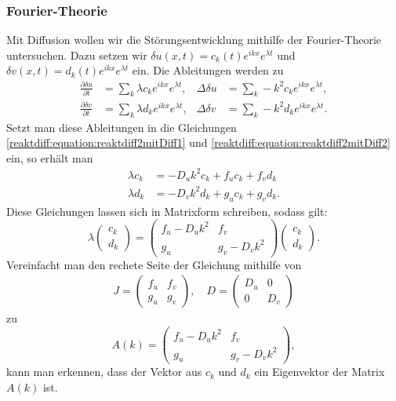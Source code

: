\subsubsection{Fourier-Theorie}
Mit Diffusion wollen wir die Störungsentwicklung mithilfe der Fourier-Theorie untersuchen.
Dazu setzen wir \(\delta u(x,t) = c_k(t) e^{ikx} e^{\lambda t}\) und \(\delta v(x,t) = d_k(t) e^{ikx} e^{\lambda t}\) ein.
Die Ableitungen werden zu
\begin{align*}
    \frac{\partial\delta u}{\partial t} &= \sum_k \lambda c_k e^{i k x} e^{\lambda t}, &
    \Delta \delta u &= \sum_k -k^2 c_k e^{i k x} e^{\lambda t},\\
    \frac{\partial\delta v}{\partial t} &= \sum_k \lambda d_k e^{i k x} e^{\lambda t}, &
    \Delta \delta v &= \sum_k -k^2 d_k e^{i k x} e^{\lambda t}.
\end{align*}
Setzt man diese Ableitungen in die Gleichungen \eqref{reaktdiff:equation:reaktdiff2mitDiff1} und \eqref{reaktdiff:equation:reaktdiff2mitDiff2} ein, so erhält man
    \begin{align*}
        \lambda c_k &= -D_u k^2 c_k + f_u c_k + f_v d_k \\
        \lambda d_k &= -D_v k^2 d_k + g_u c_k + g_v d_k.
    \end{align*}
Diese Gleichungen lassen sich in Matrixform schreiben, sodass gilt:
\begin{equation*}
    \lambda
    \begin{pmatrix}
    c_k \\
    d_k
    \end{pmatrix}
    =
    \begin{pmatrix}
        f_u - D_u k^2 & f_v \\
        g_u & g_v - D_v k^2
    \end{pmatrix}
    \begin{pmatrix}
    c_k \\
    d_k
    \end{pmatrix}.
\end{equation*}
Vereinfacht man den rechete Seite der Gleichung mithilfe von 
\begin{align*}
    J =
    \begin{pmatrix}
        f_u & f_v\\
        g_u & g_v
    \end{pmatrix}, \quad
    D =
    \begin{pmatrix}
        D_u & 0\\
        0 & D_v
    \end{pmatrix}
\end{align*}
zu 
\begin{equation*}
    A(k) =
    \begin{pmatrix}
        f_u - D_u k^2 & f_v\\
        g_u & g_v - D_v k^2
    \end{pmatrix},
\end{equation*}
kann man erkennen, dass der Vektor aus \(c_k\) und \(d_k\) ein Eigenvektor der Matrix \(A(k)\) ist.

